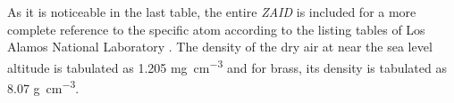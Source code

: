 As it is noticeable in the last table, the entire \emph{ZAID} is included for a more complete reference to the specific atom according to the listing tables of Los Alamos National Laboratory \cite{ACEDataTables}. The density of the dry air at near the sea level altitude is tabulated as 1.205 \unit{\milli\gram\per\cubic\centi\meter} and for brass, its density is tabulated as 8.07 \unit{\gram\per\cubic\centi\meter}.


